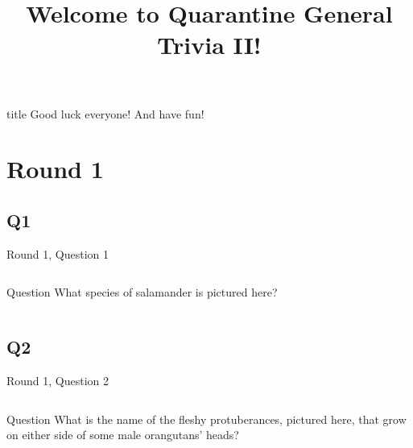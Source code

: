 \documentclass[11pt]{beamer}
\begin{document}
\title{Welcome to Quarantine General Trivia II!\vspace{-0.5in}}
\date{}

\begin{frame}
\titlepage{}
\end{frame}

\begingroup{}
\begin{frame}
\vfill{}
\begin{beamercolorbox}[sep=8pt,center,shadow=true,rounded=true]{title}
Good luck everyone! And have fun!
\end{beamercolorbox}
\vfill{}
\end{frame}
\endgroup{}
\def\thisSectionName{Plants and Animals II}
\section{Round 1}
\subsection*{Q1}
\begin{frame}[t]{Round 1, Question 1}
\begin{columns}[T,totalwidth=\linewidth]
\begin{column}{0.32\linewidth}
\begin{block}{Question}
What species of salamander is pictured here?
\end{block}
\end{column}
\begin{column}{0.65\linewidth}
\begin{center}
\texttt{[image: \{Images/axolotl]}.jpg}
\end{center}
\end{column}
\end{columns}
\end{frame}
\subsection*{Q2}
\begin{frame}[t]{Round 1, Question 2}
\begin{columns}[T,totalwidth=\linewidth]
\begin{column}{0.32\linewidth}
\begin{block}{Question}
What is the name of the fleshy protuberances, pictured here, that grow on either side of some male orangutans' heads?
\end{block}
\end{column}
\begin{column}{0.65\linewidth}
\begin{center}
\texttt{[image: \{Images/orangutan]}.jpg}
\end{center}
\end{column}
\end{columns}
\end{frame}
\end{document}
